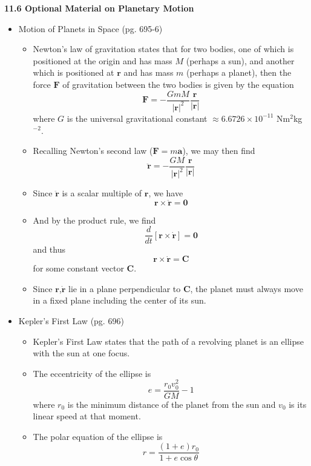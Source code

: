 \documentclass[12pt]{article}
\theoremstyle{plain}
\theoremstyle{definition}
\theoremstyle{remark}
\newcommand{\vect}[1]{\mathbf{#1}}
\begin{document}
	\newpage
	
	\centerline{\bf 11.6 Optional Material on Planetary Motion}
	
	\begin{itemize}
	\item Motion of Planets in Space (pg. 695-6)
	
		\begin{itemize}
		\item Newton's law of gravitation states that for two bodies, one of which is positioned at the origin and has mass $M$ (perhaps a sun), and another which is positioned at $\vect{r}$ and has mass $m$ (perhaps a planet), then the force $\vect{F}$ of gravitation between the two bodies is given by the equation \[\vect{F} = -\frac{GmM}{|\vect{r}|^2}\frac{\vect{r}}{|\vect{r}|}\] where $G$ is the universal gravitational constant $\approx 6.6726 \times 10^{-11}$ Nm$^2$kg$^{-2}$.
		
		\item Recalling Newton's second law ($\vect{F} = m\vect{a}$), we may then find \[\ddot{\vect{r}} = -\frac{GM}{|\vect{r}|^2}\frac{\vect{r}}{|\vect{r}|}\]
		
		\item Since $\ddot{\vect{r}}$ is a scalar multiple of $\vect{r}$, we have \[\vect{r} \times \ddot{\vect{r}} = \vect{0}\]
		
		\item And by the product rule, we find \[\frac{d}{dt}\left[\vect{r}\times\dot{\vect{r}}\right] = \vect{0}\] and thus \[\vect{r}\times\dot{\vect{r}} = \vect{C}\] for some constant vector $\vect{C}$.
		
		\item Since $\vect{r}$,$\dot{\vect{r}}$ lie in a plane perpendicular to $\vect{C}$, the planet must always move in a fixed plane including the center of its sun.
		\end{itemize}
	
	\item Kepler's First Law (pg. 696)
	
		\begin{itemize}
		\item Kepler's First Law states that the path of a revolving planet is an ellipse with the sun at one focus.
		\item The eccentricity of the ellipse is \[e = \frac{r_0v_0^2}{GM} - 1\] where $r_0$ is the minimum distance of the planet from the sun and $v_0$ is its linear speed at that moment.
		\item The polar equation of the ellipse is \[r = \frac{(1+e)r_0}{1+e\cos\theta}\]
		\end{itemize}
		

\end{itemize}
\end{document}
